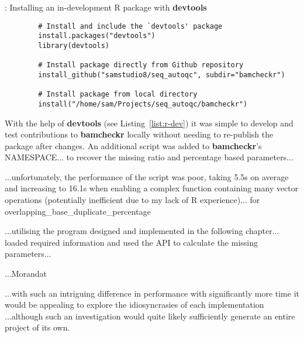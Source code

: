 \begin{listing}[H]
    \caption[r-dev]{: Installing an in-development R package with \textbf{devtools}}
    \label{list:r-dev}
    \begin{verbatim}
        # Install and include the `devtools' package
        install.packages("devtools")
        library(devtools)

        # Install package directly from Github repository
        install_github("samstudio8/seq_autoqc", subdir="bamcheckr")

        # Install package from local directory
        install("/home/sam/Projects/seq_autoqc/bamcheckr")

    \end{verbatim}
\end{listing}

With the help of \textbf{devtools}\citep{man:devtools} (see
Listing~\ref{list:r-dev}) it was simple to develop and test contributions to
\textbf{bamcheckr} locally without needing to re-publish the package after
changes. An additional script was added to \textbf{bamcheckr}'s NAMESPACE... to
recover the missing ratio and percentage based parameters...

...unfortunately, the performance of the script was poor, taking 5.5s on average
and increasing to 16.1s when enabling a complex function containing many vector
operations (potentially inefficient due to my lack of R experience)...
for overlapping\_base\_duplicate\_percentage

...utilising the program designed and implemented in the following chapter...
loaded required information and used the API to calculate the missing
parameters...

...Morandat\citep{morandat-rperf}

...with such an intriguing difference in performance with significantly more
time it would be appealing to explore the idiosyncrasies of each implementation
...although such an investigation would quite likely sufficiently generate an
entire project of its own.



